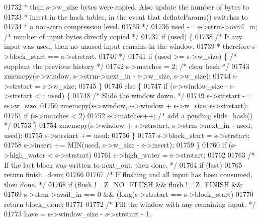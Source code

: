 \begin{DoxyCode}
{{{{{01732 \textcolor{comment}{     * than s->w\_size bytes were copied. Also update the number of bytes to}
01733 \textcolor{comment}{     * insert in the hash tables, in the event that deflateParams() switches to}
01734 \textcolor{comment}{     * a non-zero compression level.}
01735 \textcolor{comment}{     */}
01736     used -= s->strm->avail\_in;      \textcolor{comment}{/* number of input bytes directly copied */}
01737     \textcolor{keywordflow}{if} (used) \{
01738         \textcolor{comment}{/* If any input was used, then no unused input remains in the window,}
01739 \textcolor{comment}{         * therefore s->block\_start == s->strstart.}
01740 \textcolor{comment}{         */}
01741         \textcolor{keywordflow}{if} (used >= s->w\_size) \{    \textcolor{comment}{/* supplant the previous history */}
01742             s->matches = 2;         \textcolor{comment}{/* clear hash */}
01743             zmemcpy(s->window, s->strm->next\_in - s->w\_size, s->w\_size);
01744             s->strstart = s->w\_size;
01745         \}
01746         \textcolor{keywordflow}{else} \{
01747             \textcolor{keywordflow}{if} (s->window\_size - s->strstart <= used) \{
01748                 \textcolor{comment}{/* Slide the window down. */}
01749                 s->strstart -= s->w\_size;
01750                 zmemcpy(s->window, s->window + s->w\_size, s->strstart);
01751                 \textcolor{keywordflow}{if} (s->matches < 2)
01752                     s->matches++;   \textcolor{comment}{/* add a pending slide\_hash() */}
01753             \}
01754             zmemcpy(s->window + s->strstart, s->strm->next\_in - used, used);
01755             s->strstart += used;
01756         \}
01757         s->block\_start = s->strstart;
01758         s->insert += MIN(used, s->w\_size - s->insert);
01759     \}
01760     \textcolor{keywordflow}{if} (s->high\_water < s->strstart)
01761         s->high\_water = s->strstart;
01762 
01763     \textcolor{comment}{/* If the last block was written to next\_out, then done. */}
01764     \textcolor{keywordflow}{if} (last)
01765         \textcolor{keywordflow}{return} finish\_done;
01766 
01767     \textcolor{comment}{/* If flushing and all input has been consumed, then done. */}
01768     \textcolor{keywordflow}{if} (flush != Z\_NO\_FLUSH && flush != Z\_FINISH &&
01769         s->strm->avail\_in == 0 && (\textcolor{keywordtype}{long})s->strstart == s->block\_start)
01770         \textcolor{keywordflow}{return} block\_done;
01771 
01772     \textcolor{comment}{/* Fill the window with any remaining input. */}
01773     have = s->window\_size - s->strstart - 1;
}}}}}
\end{DoxyCode}
